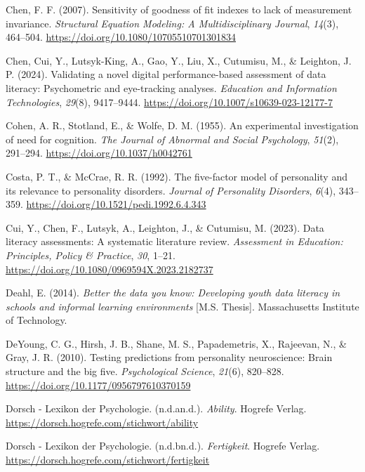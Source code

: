 \documentclass[
  12pt,
  a4paper,
  twoside]{article}
\newlength{\cslhangindent}
\newenvironment{CSLReferences}[2] %
 {\begin{list}{}{%
  \setlength{\itemindent}{0pt}
  \setlength{\leftmargin}{0pt}
  \setlength{\parsep}{0pt}
  \ifodd #1
   \setlength{\leftmargin}{\cslhangindent}
   \setlength{\itemindent}{-1\cslhangindent}
  \fi
  \setlength{\itemsep}{#2\baselineskip}}}
 {\end{list}}
\begin{document}
\begin{CSLReferences}{1}{0}
Chen, F. F. (2007). Sensitivity of goodness of fit indexes to lack of measurement invariance. \emph{Structural Equation Modeling: A Multidisciplinary Journal}, \emph{14}(3), 464--504. \url{https://doi.org/10.1080/10705510701301834}

Chen, Cui, Y., Lutsyk-King, A., Gao, Y., Liu, X., Cutumisu, M., \& Leighton, J. P. (2024). Validating a novel digital performance-based assessment of data literacy: Psychometric and eye-tracking analyses. \emph{Education and Information Technologies}, \emph{29}(8), 9417--9444. \url{https://doi.org/10.1007/s10639-023-12177-7}

Cohen, A. R., Stotland, E., \& Wolfe, D. M. (1955). An experimental investigation of need for cognition. \emph{The Journal of Abnormal and Social Psychology}, \emph{51}(2), 291--294. \url{https://doi.org/10.1037/h0042761}

Costa, P. T., \& McCrae, R. R. (1992). The five-factor model of personality and its relevance to personality disorders. \emph{Journal of Personality Disorders}, \emph{6}(4), 343--359. \url{https://doi.org/10.1521/pedi.1992.6.4.343}

Cui, Y., Chen, F., Lutsyk, A., Leighton, J., \& Cutumisu, M. (2023). Data literacy assessments: A systematic literature review. \emph{Assessment in Education: Principles, Policy \& Practice}, \emph{30}, 1--21. \url{https://doi.org/10.1080/0969594X.2023.2182737}

Deahl, E. (2014). \emph{Better the data you know: Developing youth data literacy in schools and informal learning environments} {[}M.S. Thesis{]}. Massachusetts Institute of Technology.

DeYoung, C. G., Hirsh, J. B., Shane, M. S., Papademetris, X., Rajeevan, N., \& Gray, J. R. (2010). Testing predictions from personality neuroscience: Brain structure and the big five. \emph{Psychological Science}, \emph{21}(6), 820--828. \url{https://doi.org/10.1177/0956797610370159}

Dorsch - Lexikon der Psychologie. (n.d.an.d.). \emph{Ability}. Hogrefe Verlag. \url{https://dorsch.hogrefe.com/stichwort/ability}

Dorsch - Lexikon der Psychologie. (n.d.bn.d.). \emph{Fertigkeit}. Hogrefe Verlag. \url{https://dorsch.hogrefe.com/stichwort/fertigkeit}


\end{CSLReferences}
\end{document}
